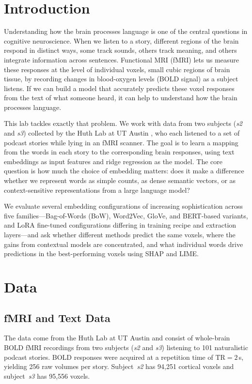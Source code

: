 \section{Introduction}

Understanding how the brain processes language is one of the central questions in cognitive neuroscience. When we listen to a story, different regions of the brain respond in distinct ways, some track sounds, others track meaning, and others integrate information across sentences. Functional MRI (fMRI) lets us measure these responses at the level of individual voxels, small cubic regions of brain tissue, by recording changes in blood-oxygen levels (BOLD signal) as a subject listens. If we can build a model that accurately predicts these voxel responses from the text of what someone heard, it can help to understand how the brain processes language.


This lab tackles exactly that problem. We work with data from two subjects (\textit{s2} and \textit{s3}) collected by the Huth Lab at UT Austin \cite{jain2018incorporating}, who each listened to a set of podcast stories while lying in an fMRI scanner. The goal is to learn a mapping from the words in each story to the corresponding brain responses, using text embeddings as input features and ridge regression as the model. The core question is how much the choice of embedding matters: does it make a difference whether we represent words as simple counts, as dense semantic vectors, or as context-sensitive representations from a large language model?


We evaluate several embedding configurations of increasing sophistication across five families---Bag-of-Words (BoW), Word2Vec, GloVe, and BERT-based variants, and LoRA fine-tuned configurations differing in training recipe and extraction layers---and ask whether different methods predict the same voxels, where the gains from contextual models are concentrated, and what individual words drive predictions in the best-performing voxels using SHAP and LIME.

\section{Data}
\label{sec:data}
\subsection{fMRI and Text Data}
\label{sec:data-fmri}

The data come from the Huth Lab at UT Austin \cite{jain2018incorporating} and consist of whole-brain BOLD fMRI recordings from two subjects (\textit{s2} and \textit{s3}) listening to 101 naturalistic podcast stories.  BOLD responses were acquired at a repetition time of $\text{TR} = 2$\,s, yielding 256 raw volumes per story.  Subject~\textit{s2} has 94{,}251 cortical voxels and subject~\textit{s3} has 95{,}556 voxels.

